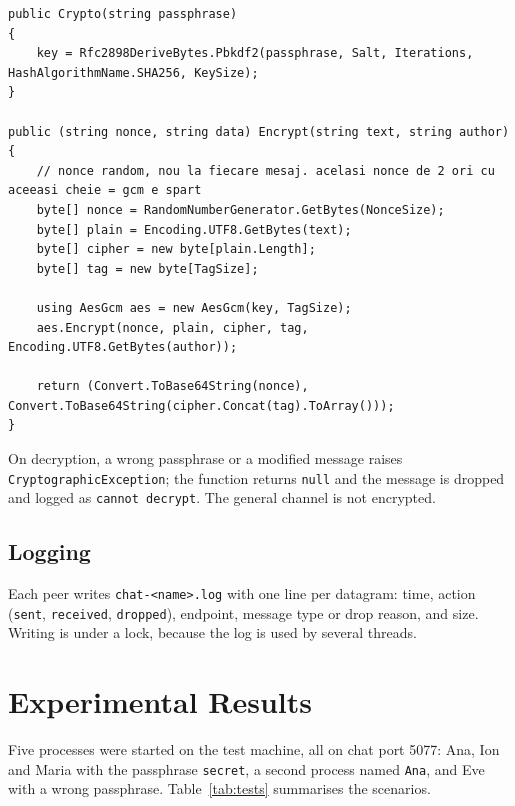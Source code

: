 \documentclass[11pt, a4paper]{article}
\begin{document}
\begin{lstlisting}[caption={Key derivation and encryption (\texttt{Crypto.cs})}]
public Crypto(string passphrase)
{
    key = Rfc2898DeriveBytes.Pbkdf2(passphrase, Salt, Iterations, HashAlgorithmName.SHA256, KeySize);
}

public (string nonce, string data) Encrypt(string text, string author)
{
    // nonce random, nou la fiecare mesaj. acelasi nonce de 2 ori cu aceeasi cheie = gcm e spart
    byte[] nonce = RandomNumberGenerator.GetBytes(NonceSize);
    byte[] plain = Encoding.UTF8.GetBytes(text);
    byte[] cipher = new byte[plain.Length];
    byte[] tag = new byte[TagSize];

    using AesGcm aes = new AesGcm(key, TagSize);
    aes.Encrypt(nonce, plain, cipher, tag, Encoding.UTF8.GetBytes(author));

    return (Convert.ToBase64String(nonce), Convert.ToBase64String(cipher.Concat(tag).ToArray()));
}
\end{lstlisting}

On decryption, a wrong passphrase or a modified message raises \texttt{CryptographicException}; the function returns \texttt{null} and the message is dropped and logged as \texttt{cannot decrypt}. The general channel is not encrypted.

\subsection{Logging}
Each peer writes \texttt{chat-<name>.log} with one line per datagram: time, action (\texttt{sent}, \texttt{received}, \texttt{dropped}), endpoint, message type or drop reason, and size. Writing is under a lock, because the log is used by several threads.

\section{Experimental Results}
Five processes were started on the test machine, all on chat port 5077: Ana, Ion and Maria with the passphrase \texttt{secret}, a second process named \texttt{Ana}, and Eve with a wrong passphrase. Table~\ref{tab:tests} summarises the scenarios.
\end{document}
